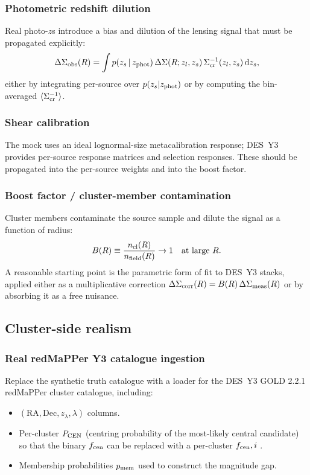 \documentclass[11pt,a4paper]{article}
\newcommand{\fcen}{f_{\rm cen}}
\newcommand{\dsig}{\Delta\Sigma}
\begin{document}
\subsubsection*{Photometric redshift dilution}

Real photo-$z$s introduce a bias and dilution of the lensing signal that
must be propagated explicitly:
\begin{equation}
  \dsig_{\rm obs}(R) = \int p(z_s\,|\,z_{\rm phot})\,\dsig(R; z_l, z_s)\,\Sigma_{\rm cr}^{-1}(z_l,z_s)\,\mathrm{d}z_s,
\end{equation}
either by integrating per-source over $p(z_s|z_{\rm phot})$ or by computing the
bin-averaged $\langle\Sigma_{\rm cr}^{-1}\rangle$.

\subsubsection*{Shear calibration}

The mock uses an ideal lognormal-size metacalibration response; DES~Y3
provides per-source response matrices and selection responses.  These should
be propagated into the per-source weights and into the boost factor.

\subsubsection*{Boost factor / cluster-member contamination}

Cluster members contaminate the source sample and dilute the signal as a
function of radius:
\begin{equation}
  B(R) \equiv \frac{n_{\rm cl}(R)}{n_{\rm field}(R)} \to 1 \quad \mathrm{at\ large}\ R.
\end{equation}
A reasonable starting point is the parametric form of \citet{Varga2019} fit to
DES~Y3 stacks, applied either as a multiplicative correction
$\dsig_{\rm corr}(R) = B(R)\,\dsig_{\rm meas}(R)$ or by absorbing it as a free
nuisance.

\subsection{Cluster-side realism}

\subsubsection*{Real redMaPPer Y3 catalogue ingestion}

Replace the synthetic truth catalogue with a loader for the DES~Y3 GOLD
2.2.1 redMaPPer cluster catalogue, including:
\begin{itemize}[noitemsep]
  \item $(\mathrm{RA}, \mathrm{Dec}, z_\lambda, \lambda)$ columns.
  \item Per-cluster $P_{\rm CEN}$ (centring probability of the most-likely
        central candidate) so that the binary
        $\fcen$ can be replaced with a per-cluster $\fcen,i$
        \citep{Rykoff2016}.
  \item Membership probabilities $p_{\rm mem}$ used to construct the magnitude
        gap.
\end{itemize}
\end{document}
